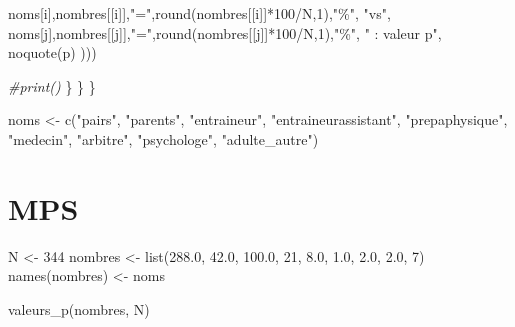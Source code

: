 \documentclass[
]{article}
\newenvironment{Shaded}{\begin{snugshade}}{\end{snugshade}}
\newcommand{\CommentTok}[1]{\textcolor[rgb]{0.56,0.35,0.01}{\textit{#1}}}
\newcommand{\DecValTok}[1]{\textcolor[rgb]{0.00,0.00,0.81}{#1}}
\newcommand{\FloatTok}[1]{\textcolor[rgb]{0.00,0.00,0.81}{#1}}
\newcommand{\FunctionTok}[1]{\textcolor[rgb]{0.00,0.00,0.00}{#1}}
\newcommand{\NormalTok}[1]{#1}
\newcommand{\OtherTok}[1]{\textcolor[rgb]{0.56,0.35,0.01}{#1}}
\newcommand{\SpecialCharTok}[1]{\textcolor[rgb]{0.00,0.00,0.00}{#1}}
\newcommand{\StringTok}[1]{\textcolor[rgb]{0.31,0.60,0.02}{#1}}
\begin{document}
\begin{Shaded}
\begin{Highlighting}[]
\NormalTok{        noms[i],nombres[[i]],}\StringTok{"="}\NormalTok{,}\FunctionTok{round}\NormalTok{(nombres[[i]]}\SpecialCharTok{*}\DecValTok{100}\SpecialCharTok{/}\NormalTok{N,}\DecValTok{1}\NormalTok{),}\StringTok{"\%"}\NormalTok{,  }
        \StringTok{"vs"}\NormalTok{,}
\NormalTok{        noms[j],nombres[[j]],}\StringTok{"="}\NormalTok{,}\FunctionTok{round}\NormalTok{(nombres[[j]]}\SpecialCharTok{*}\DecValTok{100}\SpecialCharTok{/}\NormalTok{N,}\DecValTok{1}\NormalTok{),}\StringTok{"\%"}\NormalTok{,  }
        \StringTok{"    : valeur p"}\NormalTok{,}
        \FunctionTok{noquote}\NormalTok{(p)}
\NormalTok{       )))}

      \CommentTok{\#print()}
\NormalTok{    \} }
\NormalTok{  \}}
\NormalTok{\}}

\NormalTok{noms }\OtherTok{\textless{}{-}} \FunctionTok{c}\NormalTok{(}\StringTok{"pairs"}\NormalTok{, }\StringTok{"parents"}\NormalTok{, }\StringTok{"entraineur"}\NormalTok{, }\StringTok{"entraineurassistant"}\NormalTok{, }
          \StringTok{"prepaphysique"}\NormalTok{, }\StringTok{"medecin"}\NormalTok{, }\StringTok{"arbitre"}\NormalTok{, }\StringTok{"psychologe"}\NormalTok{, }\StringTok{"adulte\_autre"}\NormalTok{)}
\end{Highlighting}
\end{Shaded}

\hypertarget{mps}{%
\section{MPS}\label{mps}}

\begin{Shaded}
\begin{Highlighting}[]
\NormalTok{N }\OtherTok{\textless{}{-}} \DecValTok{344}
\NormalTok{nombres }\OtherTok{\textless{}{-}} \FunctionTok{list}\NormalTok{(}\FloatTok{288.0}\NormalTok{, }\FloatTok{42.0}\NormalTok{, }\FloatTok{100.0}\NormalTok{,   }\DecValTok{21}\NormalTok{, }\FloatTok{8.0}\NormalTok{, }\FloatTok{1.0}\NormalTok{,   }\FloatTok{2.0}\NormalTok{, }\FloatTok{2.0}\NormalTok{, }\DecValTok{7}\NormalTok{)}
\FunctionTok{names}\NormalTok{(nombres) }\OtherTok{\textless{}{-}}\NormalTok{ noms}

\FunctionTok{valeurs\_p}\NormalTok{(nombres, N)}
\end{Highlighting}
\end{Shaded}
\end{document}
